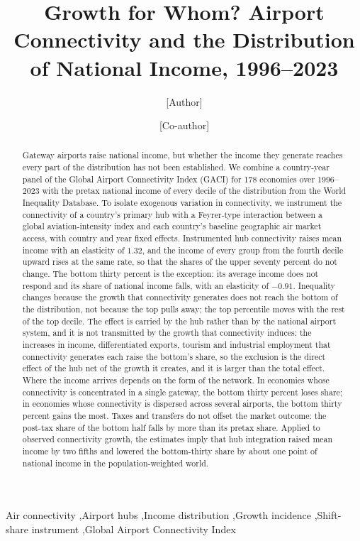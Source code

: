 \begin{frontmatter}

\title{Growth for Whom? Airport Connectivity and the Distribution of National Income, 1996--2023}

\author[a]{[Author]}
\ead{[email]}
\author[a]{[Co-author]}
\address[a]{[Affiliation]}

\begin{abstract}
Gateway airports raise national income, but whether the income they generate reaches every part of the distribution has not been established. We combine a country-year panel of the Global Airport Connectivity Index (GACI) for 178 economies over 1996--2023 with the pretax national income of every decile of the distribution from the World Inequality Database. To isolate exogenous variation in connectivity, we instrument the connectivity of a country's primary hub with a Feyrer-type interaction between a global aviation-intensity index and each country's baseline geographic air market access, with country and year fixed effects. Instrumented hub connectivity raises mean income with an elasticity of $1.32$, and the income of every group from the fourth decile upward rises at the same rate, so that the shares of the upper seventy percent do not change. The bottom thirty percent is the exception: its average income does not respond and its share of national income falls, with an elasticity of $-0.91$. Inequality changes because the growth that connectivity generates does not reach the bottom of the distribution, not because the top pulls away; the top percentile moves with the rest of the top decile. The effect is carried by the hub rather than by the national airport system, and it is not transmitted by the growth that connectivity induces: the increases in income, differentiated exports, tourism and industrial employment that connectivity generates each raise the bottom's share, so the exclusion is the direct effect of the hub net of the growth it creates, and it is larger than the total effect. Where the income arrives depends on the form of the network. In economies whose connectivity is concentrated in a single gateway, the bottom thirty percent loses share; in economies whose connectivity is dispersed across several airports, the bottom thirty percent gains the most. Taxes and transfers do not offset the market outcome: the post-tax share of the bottom half falls by more than its pretax share. Applied to observed connectivity growth, the estimates imply that hub integration raised mean income by two fifths and lowered the bottom-thirty share by about one point of national income in the population-weighted world.
\end{abstract}

\begin{keyword}
Air connectivity \sep Airport hubs \sep Income distribution \sep Growth incidence \sep Shift-share instrument \sep Global Airport Connectivity Index
\end{keyword}

\end{frontmatter}

